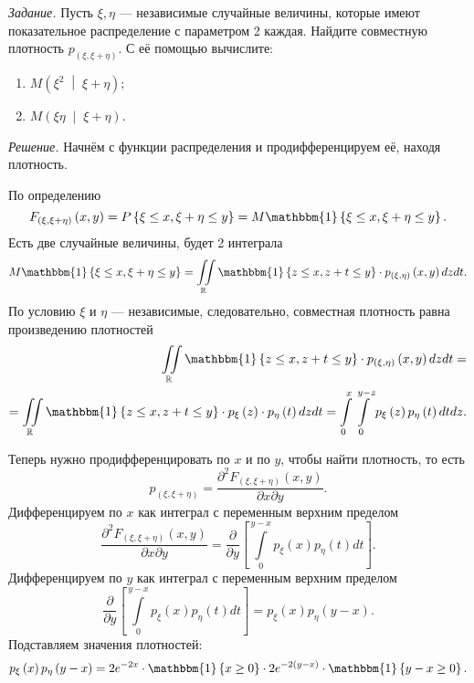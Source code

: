 \textit{Задание.}
Пусть $ \xi, \eta $ --- независимые случайные величины,
которые имеют показательное распределение с параметром 2 каждая.
Найдите совместную плотность $p_{ \left( \xi, \xi + \eta \right) }$.
С её помощью вычислите:
\begin{enumerate}[label=\alph*)]
  \item $M \left( \xi^2 \; \middle| \; \xi + \eta \right) $;
  \item $M \left( \xi \eta \; \middle| \; \xi + \eta \right) $.
\end{enumerate}

\textit{Решение.} Начнём с функции распределения и продифференцируем её, находя плотность.

По определению
$$F_{ \left( \xi, \xi + \eta \right) } \left( x, y \right) =
  P \left\{ \xi \leq x, \xi + \eta \leq y \right\} =
  M \mathbbm{1} \left\{ \xi \leq x, \xi + \eta \leq y \right\}.$$
Есть две случайные величины, будет 2 интеграла
$$M \mathbbm{1} \left\{ \xi \leq x, \xi + \eta \leq y \right\} =
  \iint \limits_{ \mathbb{R}}
    \mathbbm{1} \left\{ z \leq x, z + t \leq y \right\} \cdot
    p_{ \left( \xi, \eta \right) } \left( x, y \right)
  dzdt.$$
По условию $ \xi $ и $ \eta $ --- независимые, следовательно,
совместная плотность равна произведению плотностей
\begin{equation*}
  \begin{split}
    \iint \limits_{ \mathbb{R}}
      \mathbbm{1} \left\{ z \leq x, z + t \leq y \right\} \cdot
      p_{ \left( \xi, \eta \right) } \left( x, y \right)
    dzdt = \\
    = \iint \limits_{ \mathbb{R}}
      \mathbbm{1} \left\{ z \leq x, z + t \leq y \right\} \cdot
      p_{ \xi } \left( z \right) \cdot p_{ \eta } \left( t \right)
    dzdt =
    \int \limits_0^x
      \int \limits_0^{y - z} p_{ \xi } \left( z \right) p_{ \eta } \left( t \right) dt
    dz.
  \end{split}
\end{equation*}

Теперь нужно продифференцировать по $x$ и по $y$, чтобы найти плотность, то есть
$$p_{ \left( \xi, \xi + \eta \right) } =
  \frac{ \partial^2 F_{ \left( \xi, \xi + \eta \right) } \left( x, y \right) }{ \partial x \partial y}.$$
Дифференцируем по $x$ как интеграл с переменным верхним пределом
$$ \frac{ \partial^2 F_{ \left( \xi, \xi + \eta \right) } \left( x, y \right) }{ \partial x \partial y} =
  \frac{ \partial }{ \partial y}
    \left[
      \int \limits_0^{y - x} p_{ \xi } \left( x \right) p_{ \eta } \left( t \right) dt
    \right].$$
Дифференцируем по $y$ как интеграл с переменным верхним пределом
$$ \frac{ \partial }{ \partial y}
    \left[
      \int \limits_0^{y - x} p_{ \xi } \left( x \right) p_{ \eta } \left( t \right) dt
    \right] =
  p_{ \xi } \left( x \right) p_{ \eta } \left( y - x \right).$$
Подставляем значения плотностей:
$$p_{ \xi } \left( x \right) p_{ \eta } \left( y - x \right) =
  2e^{-2x} \cdot \mathbbm{1} \left\{ x \geq 0 \right\} \cdot
  2e^{-2 \left( y - x \right) } \cdot \mathbbm{1} \left\{ y - x \geq 0 \right\}.$$

